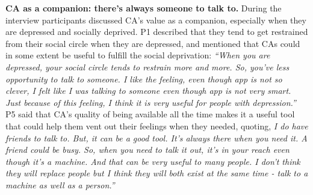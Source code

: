             
            
            
        \textbf{\ac{CA} as a companion: there's always someone to talk to. }
            During the interview participants discussed \ac{CA}'s value as a companion, especially when they are depressed and socially deprived. P1 described that they tend to get restrained from their social circle when they are depressed, and mentioned that \acp{CA} could in some extent be useful to fulfill the social deprivation:
                \textit{``When you are depressed, your social circle tends to restrain more and more. So, you’ve less opportunity to talk to someone. I like the feeling, even though \acl{app} is not so clever, I felt like I was talking to someone even though \acl{app} is not very smart. Just because of this feeling, I think it is very useful for people with depression.''}
            P5 said that \ac{CA}'s quality of being available all the time makes it a useful tool that could help them vent out their feelings when they needed, quoting,
                \textit{I do have friends to talk to. But, it can be a good tool. It’s always there when you need it. A friend could be busy. So, when you need to talk it out, it’s in your reach even though it’s a machine. And that can be very useful to many people. I don't think they will replace people but I think they will both exist at the same time - talk to a machine as well as a person.'' }
            
